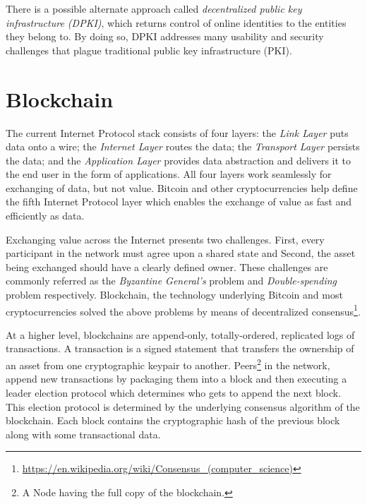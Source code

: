 There is a possible alternate approach called \textit{decentralized public key infrastructure (DPKI)}, which returns control of online identities to the entities they belong to. By doing so, DPKI addresses many usability and security challenges that plague traditional public key infrastructure (PKI)\cite{allen2015decentralized}.

\section{Blockchain}
The current Internet Protocol stack consists of four layers: the \textit{Link Layer} puts data onto a wire; the \textit{Internet Layer} routes the data; the \textit{Transport Layer} persists the data; and the \textit{Application Layer} provides data abstraction and delivers it to the end user in the form of applications. All four layers work seamlessly for exchanging of data, but not value. Bitcoin\cite{nakamoto2008bitcoin} and other cryptocurrencies help define the fifth Internet Protocol layer which enables the exchange of value as fast and efficiently as data\cite{raval2016decentralized}.

Exchanging value across the Internet presents two challenges. First, every participant in the network must agree upon a shared state and Second, the asset being exchanged should have a clearly defined owner. These challenges are commonly referred as the \textit{Byzantine General's} problem\cite{lamport1982byzantine} and \textit{Double-spending} problem\cite{chohan2017double} respectively. Blockchain, the technology underlying Bitcoin and most cryptocurrencies solved the above problems by means of decentralized consensus\footnote{\url{https://en.wikipedia.org/wiki/Consensus_(computer_science)}}.

At a higher level, blockchains are append-only, totally-ordered, replicated logs of transactions\cite{bonneau2015research}. A transaction is a signed statement that transfers the ownership of an asset from one cryptographic keypair to another. Peers\footnote{A Node having the full copy of the blockchain.} in the network, append new transactions by packaging them into a block and then executing a leader election protocol which determines who gets to append the next block\cite{nelson2016extending}. This election protocol is determined by the underlying consensus algorithm of the blockchain. Each block contains the cryptographic hash of the previous block along with some transactional data.
